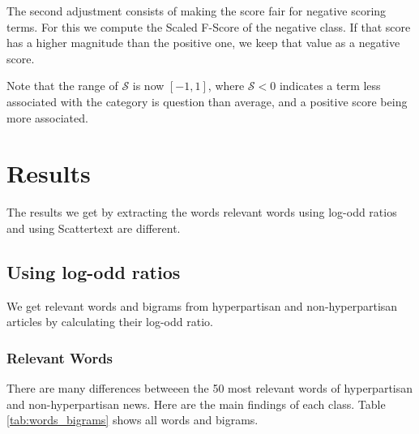 \documentclass[11pt,a4paper]{article}
\begin{document}
The second adjustment consists of making the score fair for negative scoring terms. For this we compute the Scaled F-Score of the negative class. If that score has a higher magnitude than the positive one, we keep that value as a negative score.

Note that the range of $\mathcal{S}$ is now $[-1, 1]$, where $\mathcal{S} < 0$ indicates a term less associated with the category is question than average, and a positive score being more associated.

\section{Results}

The results we get by extracting the words relevant words using log-odd ratios and using Scattertext are different.

\subsection{Using log-odd ratios}

We get relevant words and bigrams from hyperpartisan and non-hyperpartisan articles by calculating their log-odd ratio.

\subsubsection{Relevant Words}

There are many differences betweeen the 50 most relevant words of
hyperpartisan and non-hyperpartisan news. Here are the main findings of each class. Table \ref{tab:words_bigrams} shows all words and bigrams.
\end{document}
